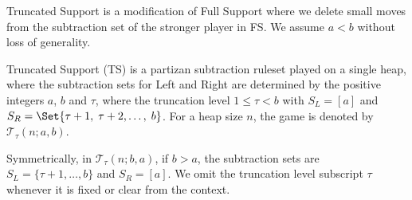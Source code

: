 \documentclass[oneside,reqno]{amsart}
\newcommand{\ts}{\mathcal{T}}
\begin{document}
{\sc Truncated Support} is a modification of {\sc Full Support} where we delete small moves from the subtraction set of the stronger player in {\sc FS}. We assume $a<b$ without loss of generality.

\begin{definition}
     {\sc Truncated Support} ({\sc TS}) is a partizan subtraction ruleset played on a single heap, where the subtraction sets for Left and Right are determined by the positive integers $a$, $b$ and $\tau$, where the truncation level $1\le \tau<b$ with $S_L=[a]$ and $S_R=\Set{\tau+1,\;\tau+2,\dots,\; b}$. 
    For a heap size $n$, the game is denoted by $\ts_\tau(n; a, b)$. 
\end{definition}

Symmetrically, in $\ts_\tau(n;b,a)$, if $b>a$, the subtraction sets are $S_L=\{\tau+1,\dots,b\}$ and $S_R=[a]$.
We omit the truncation level subscript $\tau$ whenever it is fixed or clear from the context. 
\end{document}
